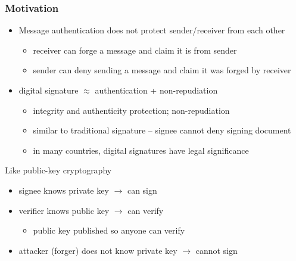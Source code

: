 \documentclass[draft]{article}
\begin{document}
\subsubsection*{Motivation}
\begin{itemize}[nosep]
    \item Message authentication does not protect sender/receiver from each other
          \begin{itemize}[nosep]
              \item receiver can forge a message and claim it is from sender
              \item sender can deny sending a message and claim it was forged by receiver
          \end{itemize}
    \item digital signature $\approx$ authentication + non-repudiation
          \begin{itemize}[nosep]
              \item integrity and authenticity protection; non-repudiation
              \item similar to traditional signature -- signee cannot deny signing document
              \item in many countries, digital signatures have legal significance
          \end{itemize}
\end{itemize}
Like public-key cryptography
\begin{itemize}[nosep]
    \item signee knows private key $\rightarrow$ can sign
    \item verifier knows public key $\rightarrow$ can verify
          \begin{itemize}[nosep]\item public key published so anyone can verify\end{itemize}
    \item attacker (forger) does not know private key $\rightarrow$ cannot sign
\end{itemize}
\end{document}

